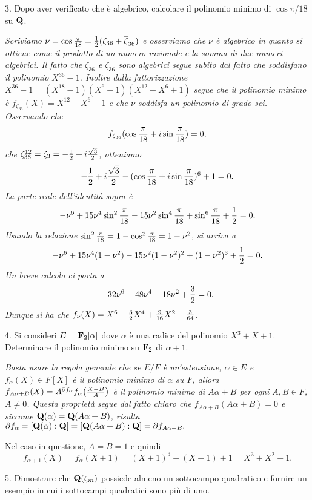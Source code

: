\item{3.} Dopo aver verificato che \`e algebrico, calcolare il
polinomio minimo di $\cos \pi/18$ su ${\bf Q}$.

\smallskip{} \it Scriviamo $\nu=\cos {\pi\over18}
={1\over2}(\zeta_{36}+\overline{\zeta}_{36})$ e osserviamo che $\nu$
\`e algebrico in quanto si ottiene come il prodotto di un numero
razionale e la somma di due numeri algebrici. Il fatto che
$\zeta_{36}$ e $\overline{\zeta}_{36}$ sono algebrici segue subito
dal fatto che soddisfano il polinomio $X^{36}-1$. Inoltre dalla
fattorizzazione $X^{36}-1=(X^{18}-1)(X^6+1)(X^{12}-X^6+1)$ segue che
il polinomio minimo \`e $f_{\zeta_{36}}(X)=X^{12}-X^6+1$ e che $\nu$
soddisfa un polinomio di grado sei. Osservando che
$$f_{\zeta_{36}}(\cos{\pi\over18}+i\sin{\pi\over18})=0,$$
che $\zeta_{36}^{12}=\zeta_3=-{1\over2}+i{\sqrt{3}\over2}$,
otteniamo
$$-{1\over2}+i{\sqrt{3}\over2}-(\cos{\pi\over18}+i\sin{\pi\over18})^6+1=0.$$
La parte reale dell'identit\`a sopra \`e $$ -
\nu^6+15\nu^4\sin^2{\pi\over18}-15\nu^2\sin^4{\pi\over18}+\sin^6{\pi\over18}+{1\over2}=0.$$
Usando la relazione
$\sin^2{\pi\over18}=1-\cos^2{\pi\over18}=1-\nu^2$, si arriva a
$$ -\nu^6+15\nu^4(1-\nu^2)-15\nu^2(1-\nu^2)^2+(1-\nu^2)^3+{1\over2}=0.$$
Un breve calcolo ci porta a
$$-32\nu^6+48\nu^4-18\nu^2 +{3\over2}=0.$$
Dunque si ha che
$f_\nu(X)=X^6-{3\over2}X^4+{9\over16}X^2-{3\over64}$.\rm
\bigskip

\item{4.} Si consideri $E={\bf F}_2[\alpha]$ dove $\alpha$ \`{e}
una radice del polinomio $X^3+X+1$. Determinare il polinomio
minimo su ${\bf F}_2$ di $\alpha+1$.

\smallskip{} \it Basta usare la regola generale che
se $E/F$ \`e un'estensione, $\alpha\in E$ e $f_\alpha(X)\in F[X]$
\`e il polinomio minimo di $\alpha$ su $F$, allora
$f_{A\alpha+B}(X)= A^{\partial f_\alpha}f_{\alpha}\big({X-B\over
A}\big)$ \`e il polinomio minimo di $A\alpha+B$ per ogni $A,B\in
F$, $A\neq 0$. Questa propriet\`{a} segue dal fatto chiaro che
$f_{A\alpha+B}(A\alpha+B)=0$ e siccome ${\bf Q}(\alpha)={\bf
Q}(A\alpha+B)$, risulta $\partial f_\alpha=[{\bf Q}(\alpha):{\bf
Q}]=[{\bf Q}(A\alpha+B):{\bf Q}]=\partial f_{A\alpha+B}.$

Nel caso in questione, $A=B=1$ e quindi
$$f_{\alpha+1}(X)=f_\alpha(X+1)=(X+1)^3+(X+1)+1=X^3+X^2+1.$$
 \rm\bigskip

\item{5.} Dimostrare che ${\bf Q}(\zeta_m)$ possiede almeno un sottocampo
quadratico e fornire un esempio in cui i sottocampi quadratici sono
pi\`u di uno.

